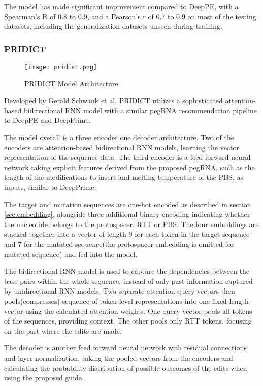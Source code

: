 The model has made significant improvement compared to DeepPE, with a Spearman's R of 0.8 to 0.9, and a Pearson's r of 0.7 to 0.9 on most of the testing datasets, including the generalization datasets unseen during training.

\subsubsection{PRIDICT}

\begin{figure}[ht]
    \centering
    \texttt{[image: pridict.png]}
    \caption{PRIDICT Model Architecture\cite{mathisPredictingPrimeEditing2023}}
    \label{fig:pridict}
\end{figure}


Developed by Gerald Schwank et al, PRIDICT utilizes a sophisticated attention-based bidirectional RNN model with a similar pegRNA recommendation pipeline to DeepPE and DeepPrime. 

The model overall is a three encoder one decoder architecture. Two of the encoders are attention-based bidirectional RNN models, learning the vector representation of the sequence data. The third encoder is a feed forward neural network taking explicit features derived from the proposed pegRNA, such as the length of the modifications to insert and melting temperature of the PBS, as inputs, similar to DeepPrime.

The target and mutation sequences are one-hot encoded as described in section \ref{sec:embedding}, alongside three additional binary encoding indicating whether the nucleotide belongs to the protospacer, RTT or PBS. The four embeddings are stacked together into a vector of length 9 for each token in the target sequence and 7 for the mutated sequence(the protospacer embedding is omitted for mutated sequence) and fed into the model.

The bidirectional RNN model is used to capture the dependencies between the base pairs within the whole sequence, instead of only past information captured by unidirectional RNN models. Two separate attention query vectors then pools(compresses) sequence of token-level representations into one fixed length vector using the calculated attention weights. One query vector pools all tokens of the sequences, providing context. The other pools only RTT tokens, focusing on the part where the edits are made. 

The decoder is another feed forward neural network with residual connections and layer normalization, taking the pooled vectors from the encoders and calculating the probability distribution of possible outcomes of the edits when using the proposed guide. 


